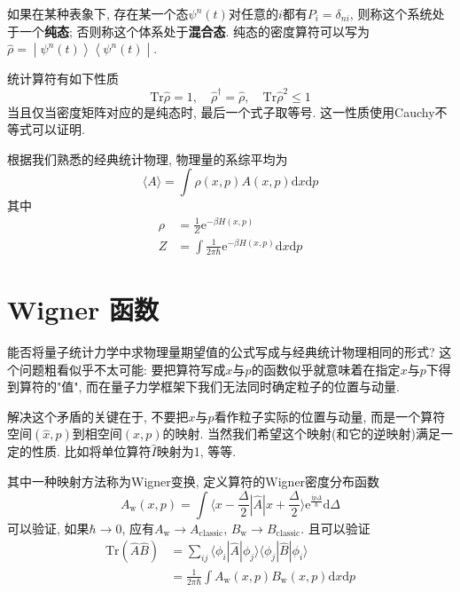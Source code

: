         如果在某种表象下, 存在某一个态$\psi^{n}(t)$对任意的$i$都有$P_i = \delta_{ni}$, 则称这个系统处于一个\textbf{纯态}; 否则称这个体系处于\textbf{混合态}.
        纯态的密度算符可以写为$\hat{\rho} = \left. \middle| {\psi^{n}(t)} \right\rangle \left\langle {\psi^{n}(t)} \middle| \right.$. 

        统计算符有如下性质
        \begin{equation}
            \mathrm{Tr}\hat\rho = 1, \quad
            \hat\rho^{\dagger} = \hat\rho, \quad
            \mathrm{Tr}\hat\rho^{2} \leq 1
        \end{equation}
        当且仅当密度矩阵对应的是纯态时, 最后一个式子取等号. 这一性质使用Cauchy不等式可以证明. 

        \splitline

        根据我们熟悉的经典统计物理, 物理量的系综平均为
        \begin{equation}
            \langle A \rangle = \int \rho(x,p) A(x,p) \mathrm{d}x\mathrm{d}p
        \end{equation}
        其中
        \begin{equation}\begin{aligned}
            \rho &= \frac 1Z \mathrm{e}^{-\beta H(x,p)}\\
            Z &= \int \frac 1{2\pi \hbar} \mathrm{e}^{-\beta H(x,p)} \mathrm{d}x \mathrm{d}p
        \end{aligned}\end{equation}

    \section{Wigner 函数}

        能否将量子统计力学中求物理量期望值的公式写成与经典统计物理相同的形式? 这个问题粗看似乎不太可能: 要把算符写成$x$与$p$的函数似乎就意味着在指定$x$与$p$下得到算符的"值", 而在量子力学框架下我们无法同时确定粒子的位置与动量. 
        
        解决这个矛盾的关键在于, 不要把$x$与$p$看作粒子实际的位置与动量, 而是一个算符空间$(\hat x, \hat p)$到相空间$(x, p)$的映射. 当然我们希望这个映射(和它的逆映射)满足一定的性质. 比如将单位算符$\hat I$映射为1, 等等.

        其中一种映射方法称为Wigner变换, 定义算符的Wigner密度分布函数
        \begin{equation}
            A_\mathrm{w}(x,p) = \int \langle x - \frac {\Delta}2 | \hat{A} | x + \frac {\Delta}2 \rangle \mathrm{e}^{\frac {\mathrm{i} p \Delta}{\hbar}} \mathrm{d} \Delta
        \end{equation}
        可以验证, 如果$\hbar \to 0$, 应有$A_\mathrm{w} \to A_\mathrm{classic}$, $B_\mathrm{w} \to B_\mathrm{classic}$. 且可以验证
        \begin{equation}\begin{aligned}
            \mathrm{Tr} (\hat{A}\hat{B}) &= \sum_{ij} \langle \phi_{i} | \hat{A} | \phi_{j} \rangle \langle \phi_{j} | \hat{B} | \phi_{i} \rangle \\
            &= \frac 1{2\pi\hbar} \int A_\mathrm{w}(x,p) B_\mathrm{w}(x,p) \mathrm{d}x \mathrm{d}p
        \end{aligned}\end{equation}

